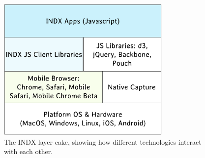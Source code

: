 \documentclass{acm_proc_article-sp}
\begin{document}
\begin{figure}
\centering
\includegraphics[width=8.5cm]{layercake.png}
\caption{The INDX layer cake, showing how different technologies interact with each other.}\label{fig:layercake}
\end{figure}





\balancecolumns
\end{document}
